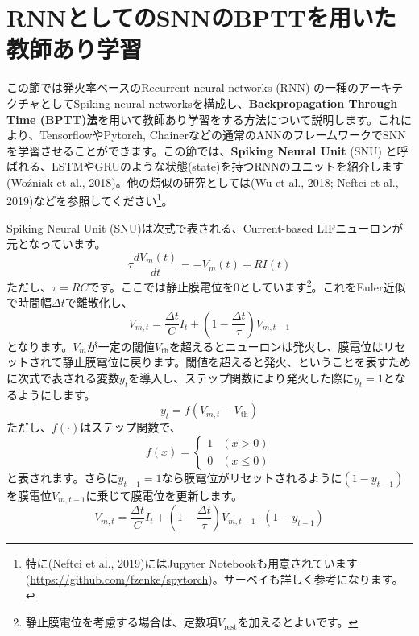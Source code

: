 \section{RNNとしてのSNNのBPTTを用いた教師あり学習}
この節では発火率ベースのRecurrent neural networks (RNN) の一種のアーキテクチャとしてSpiking neural networksを構成し、\textbf{Backpropagation Through Time (BPTT)法}を用いて教師あり学習をする方法について説明します。これにより、TensorflowやPytorch, Chainerなどの通常のANNのフレームワークでSNNを学習させることができます。この節では、\textbf{Spiking Neural Unit }(SNU) と呼ばれる、LSTMやGRUのような状態(state)を持つRNNのユニットを紹介します(Woźniak et al., 2018)。他の類似の研究としては(Wu et al., 2018; Neftci et al., 2019)などを参照してください\footnote{特に(Neftci et al., 2019)にはJupyter Notebookも用意されています(\url{https://github.com/fzenke/spytorch})。サーベイも詳しく参考になります。}。\par
Spiking Neural Unit (SNU)は次式で表される、Current-based LIFニューロンが元となっています。
\begin{equation}
\tau \frac{dV_{m}(t)}{dt}=-V_{m}(t)+R I(t)    
\end{equation}
ただし、$\tau=RC$です。ここでは静止膜電位を0としています\footnote{静止膜電位を考慮する場合は、定数項$V_{\text{rest}}$を加えるとよいです。}。これをEuler近似で時間幅$\Delta t$で離散化し、
\begin{equation}
V_{m, t}=\frac{\Delta t}{C} I_{t}+\left(1-\frac{\Delta t}{\tau}\right)V_{m, t-1}
\end{equation}
となります。$V_m$が一定の閾値$V_{\text{th}}$を超えるとニューロンは発火し、膜電位はリセットされて静止膜電位に戻ります。閾値を超えると発火、ということを表すために次式で表される変数$y_t$を導入し、ステップ関数により発火した際に$y_t=1$となるようにします。
\begin{equation}
y_{t}=f\left(V_{m, t}-V_{\text{th}}\right) 
\end{equation}
ただし、$f(\cdot)$はステップ関数で、
\begin{equation}
f(x) = \begin{cases}
    1 & (x>0) \\
    0 & (x\leq0)
  \end{cases}    
\end{equation}
と表されます。さらに$y_{t-1}=1$なら膜電位がリセットされるように$\left(1-y_{t-1}\right)$を膜電位$V_{m, t-1}$に乗じて膜電位を更新します。
\begin{equation}
V_{m, t}=\frac{\Delta t}{C} I_{t}+\left(1-\frac{\Delta t}{\tau}\right)V_{m, t-1}\cdot \left(1-y_{t-1}\right)
\end{equation}
